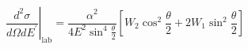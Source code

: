 \begin{equation}
	\left.\frac{d^2\sigma}{d\Omega dE^\prime}\right\rvert_{\mathrm{lab}} = \frac{\alpha^2}{4E^{2}\sin^{4}\frac{\theta}{2}} \left[W_{2}\cos^{2}\frac{\theta}{2} + 2W_{1}\sin^{2}\frac{\theta}{2}\right]
	\label{xs_inelastic}
\end{equation}


%
%
%
%
%
%
%
%
%
%
%
%
%
